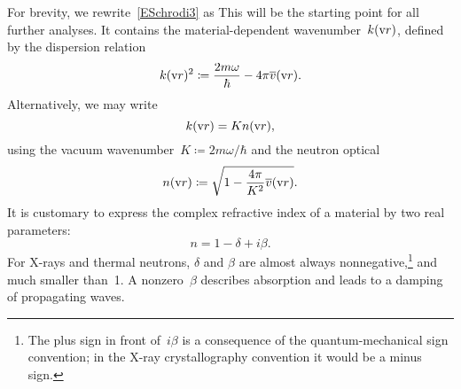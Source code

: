 For brevity, we rewrite~\cref{ESchrodi3} as
%
This  will be the starting point for all further analyses.
It contains the material-dependent wavenumber~$k(\text{v}{r})$, defined by the dispersion relation
%
%
%
\begin{equation}\label{Edispersion}
  k(\text{v}{r})^2 \coloneqq \frac{2m\omega}{\hbar} - 4\pi\overline{v}(\text{v}{r}).
\end{equation}
Alternatively, we may write
\begin{equation}\label{Ekkn}
  k(\text{v}{r})=K n(\text{v}{r}),
\end{equation}
using the vacuum wavenumber~$K\coloneqq 2m\omega/\hbar$
%
and the neutron optical 
%
%
%
\begin{equation}\label{EnRefrIndx}
  n(\text{v}{r})\coloneqq \sqrt{1-\frac{4\pi}{K^2}\overline{v}(\text{v}{r})}.
\end{equation}
It is customary to express the complex refractive index of a material
by two real parameters:
\begin{equation}\label{Endb1}
  n =  1-\delta +i\beta.
\end{equation}
%
%
For X-rays and thermal neutrons,
$\delta$ and $\beta$ are almost always nonnegative,\footnote
{The plus sign in front of~$i\beta$ is a consequence of
the quantum-mechanical sign convention;
in the X-ray crystallography convention it would be a minus sign.
%
}
and much smaller than~1.
A nonzero~$\beta$ describes absorption and leads to a damping of propagating waves.
%
%

